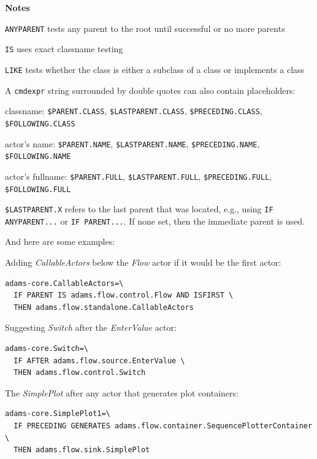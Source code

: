 \noindent \textbf{Notes}
\begin{tight_itemize}
  \item \texttt{ANYPARENT} tests any parent to the root until successful or no more parents
  \item \texttt{IS} uses exact classname testing
  \item \texttt{LIKE} tests whether the class is either a subclass of a class or implements a class
  \item A \texttt{cmdexpr} string surrounded by double quotes can also contain placeholders:
    \begin{tight_itemize}
      \item classname: \texttt{\${PARENT.CLASS}}, \texttt{\${LASTPARENT.CLASS}}, \texttt{\${PRECEDING.CLASS}}, \texttt{\${FOLLOWING.CLASS}}
      \item actor's name: \texttt{\${PARENT.NAME}}, \texttt{\${LASTPARENT.NAME}}, \texttt{\${PRECEDING.NAME}}, \texttt{\${FOLLOWING.NAME}}
      \item actor's fullname: \texttt{\${PARENT.FULL}}, \texttt{\${LASTPARENT.FULL}}, \texttt{\${PRECEDING.FULL}}, \texttt{\${FOLLOWING.FULL}}
    \end{tight_itemize}
  \item \texttt{\${LASTPARENT.X}} refers to the last parent that was located, e.g., using \texttt{IF ANYPARENT...}
  or \texttt{IF PARENT...}. If none set, then the immediate parent is used.
\end{tight_itemize}

\noindent And here are some examples:
\begin{tight_itemize}
  \item Adding \textit{CallableActors} below the \textit{Flow} actor if it would
  be the first actor:
  {\small \begin{verbatim}
adams-core.CallableActors=\
  IF PARENT IS adams.flow.control.Flow AND ISFIRST \
  THEN adams.flow.standalone.CallableActors
  \end{verbatim}}

  \item Suggesting \textit{Switch} after the \textit{EnterValue} actor:
  {\small \begin{verbatim}
adams-core.Switch=\
  IF AFTER adams.flow.source.EnterValue \
  THEN adams.flow.control.Switch
  \end{verbatim}}

  \item The \textit{SimplePlot} after any actor that generates plot containers:
  {\small \begin{verbatim}
adams-core.SimplePlot1=\
  IF PRECEDING GENERATES adams.flow.container.SequencePlotterContainer \
  THEN adams.flow.sink.SimplePlot
  \end{verbatim}}

\end{tight_itemize}

